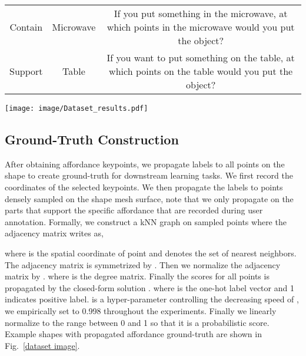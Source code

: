 \documentclass[final]{cvpr}
\begin{document}
\begin{table*}[!htb]
{\begin{tabular}{c|c|c}
         Contain         & Microwave       & If you put something in the microwave, at which points in the microwave would you put the object?                                                \\
         Support             & Table           & If you want to put something on the table, at which points on the table would you put the object?                                                \\ \hline
      \end{tabular}}
   \caption{Some examples of the proposed questions for affordance annotation. }
   \vspace{-0.4cm}
   \label{question_table}
\end{table*}


\begin{figure*}[!ht]
   \begin{center}
      \texttt{[image: image/Dataset\_results.pdf]}
   \end{center}
   \vspace{-0.4cm}
   \caption{The example of annotated data. Different affordances are shown in different colors, points annotated with multiple affordances are colored by the affordance that has the highest scores. The brighter the color, the higher the score.}
   \label{dataset image}
   \vspace{-0.5cm}
\end{figure*}


\subsection{Ground-Truth Construction}






After obtaining affordance keypoints, we propagate labels to all points on the shape to create ground-truth for downstream learning tasks. We first record the coordinates of the selected keypoints. We then propagate the labels to  points densely sampled on the shape mesh surface, note that we only propagate on the parts that support
the specific affordance that are recorded during user annotation. Formally, we construct a kNN graph on sampled points where the adjacency matrix  writes as,

where  is the  spatial coordinate of point and  denotes the set of  nearest neighbors. The adjacency matrix is symmetrized by . Then we normalize the adjacency matrix by .
where  is the degree matrix.
Finally the scores  for all points is propagated by the closed-form solution .
where  is the one-hot label vector and 1 indicates positive label.  is a hyper-parameter controlling
the decreasing speed of , we empirically set  to 0.998 throughout the experiments. Finally we linearly normalize  to the range between 0 and 1 so that it is a probabilistic score. Example shapes with propagated affordance ground-truth are shown in Fig.~\ref{dataset image}.
\end{document}
